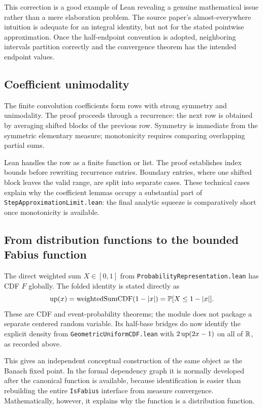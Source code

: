 \documentclass[11pt,oneside]{article}
\theoremstyle{definition}
\theoremstyle{remark}
\begin{document}
This correction is a good example of Lean revealing a genuine mathematical issue rather than a mere elaboration problem.  The source paper's almost-everywhere intuition is adequate for an integral identity, but not for the stated pointwise approximation.  Once the half-endpoint convention is adopted, neighboring intervals partition correctly and the convergence theorem has the intended endpoint values.

\subsection{Coefficient unimodality}
The finite convolution coefficients form rows with strong symmetry and unimodality.  The proof proceeds through a recurrence: the next row is obtained by averaging shifted blocks of the previous row.  Symmetry is immediate from the symmetric elementary measure; monotonicity requires comparing overlapping partial sums.

Lean handles the row as a finite function or list.  The proof establishes index bounds before rewriting recurrence entries.  Boundary entries, where one shifted block leaves the valid range, are split into separate cases.  These technical cases explain why the coefficient lemmas occupy a substantial part of \nolinkurl{StepApproximationLimit.lean}: the final analytic squeeze is comparatively short once monotonicity is available.

\subsection{From distribution functions to the bounded Fabius function}
The direct weighted sum \(X\in[0,1]\) from
\nolinkurl{ProbabilityRepresentation.lean} has CDF \(F\) globally.  The folded
identity is stated directly as
\[
  \operatorname{up}(x)=\operatorname{weightedSumCDF}(1-|x|)
         =\mathbb{P}[X\leq1-|x|].
\]
These are CDF and event-probability theorems; the module does not package a
separate centered random variable.  Its half-base bridges do now identify the
explicit density from \nolinkurl{GeometricUniformCDF.lean} with
\(2\operatorname{up}(2x-1)\) on all of \(\mathbb{R}\), as recorded above.

This gives an independent conceptual construction of the same object as the Banach fixed point.  In the formal dependency graph it is normally developed after the canonical function is available, because identification is easier than rebuilding the entire \nolinkurl{IsFabius} interface from measure convergence.  Mathematically, however, it explains why the function is a distribution function.
\end{document}
